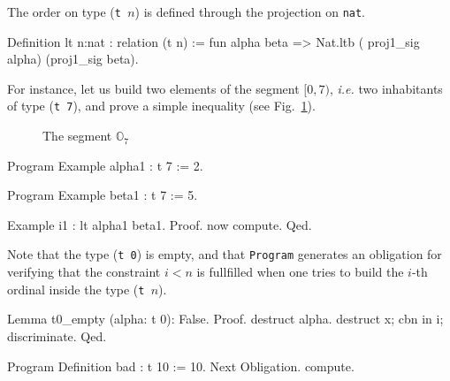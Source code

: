 The order on type (\texttt{t $n$}) is defined through the projection on \texttt{nat}.


\begin{Coqsrc}
Definition lt {n:nat} : relation (t n) :=
  fun alpha beta => Nat.ltb ( proj1_sig alpha) (proj1_sig beta).
\end{Coqsrc}

For instance, let us build two elements of the segment $[0, 7)$, \emph{i.e.} two
inhabitants of   type (\texttt{t 7}), and prove a simple  inequality (see Fig.~\ref{fig:O7}).

\begin{figure}[h]
\centering
{}

\caption{The segment $\mathbb{O}_7$\label{fig:O7}}
\end{figure}
  

\begin{Coqsrc}
Program Example alpha1 : t 7 := 2.

Program Example beta1 : t 7 := 5.

Example i1 : lt  alpha1 beta1.
Proof. now compute. Qed.
\end{Coqsrc}




Note that the type (\texttt{t 0}) is empty, and that \texttt{Program} generates an obligation
for verifying that the constraint $i<n$ is fullfilled when one tries to build the $i$-th ordinal inside the type (\texttt{t $n$}).

\begin{Coqsrc}
Lemma t0_empty (alpha: t 0): False.
Proof.
  destruct alpha.
  destruct x; cbn in i; discriminate.
Qed.


Program Definition bad : t 10 := 10.
Next Obligation.
  compute.
\end{Coqsrc}

